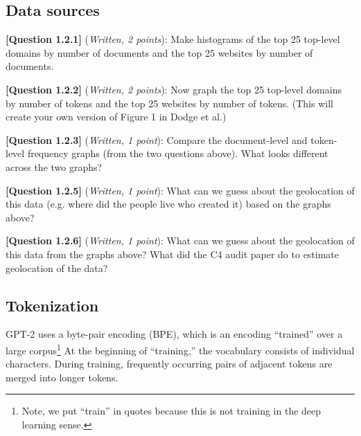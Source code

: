 \documentclass[leqno,12pt]{article}
\begin{document}
\subsection{Data sources}
\noindent \textbf{[Question 1.2.1]} (\emph{Written, 2 points}): Make histograms of the top 25 top-level domains by number of documents and the top 25 websites by number of documents. 
\begin{tcolorbox}[fit,height=10cm, width=\linewidth, blank, borderline={1pt}{-2pt}]
\end{tcolorbox}
\noindent \textbf{[Question 1.2.2]} (\emph{Written, 2 points}): Now graph the top 25 top-level domains by number of tokens and the top 25 websites by number of tokens. (This will create your own version of Figure 1 in Dodge et al.) 

\begin{tcolorbox}[fit,height=10cm, width=\linewidth, blank, borderline={1pt}{-2pt}]
\end{tcolorbox}

\noindent \textbf{[Question 1.2.3]} (\emph{Written, 1 point}): Compare the document-level and token-level frequency graphs (from the two questions above).  What looks different across the two graphs? 
\begin{tcolorbox}[fit,height=5cm, width=\linewidth, blank, borderline={1pt}{-2pt}]
\end{tcolorbox}

\noindent \textbf{[Question 1.2.5]} (\emph{Written, 1 point}): What can we guess about the geolocation of this data (e.g. where did the people live who created it) based on the graphs above?
\begin{tcolorbox}[fit,height=3cm, width=\linewidth, blank, borderline={1pt}{-2pt}]
\end{tcolorbox}

\noindent \textbf{[Question 1.2.6]} (\emph{Written, 1 point}): What can we guess about the geolocation of this data from the graphs above? What did the C4 audit paper do to estimate geolocation of the data? 
\begin{tcolorbox}[fit,height=3cm, width=\linewidth, blank, borderline={1pt}{-2pt}]
\end{tcolorbox}

\subsection{Tokenization}
\noindent GPT-2 uses a byte-pair encoding (BPE), which is an encoding ``trained'' over a large corpus\footnote{Note, we put ``train'' in quotes because this is not training in the deep learning sense.}
At the beginning of ``training,'' the vocabulary consists of individual characters.
During training, frequently occurring pairs of adjacent tokens are merged into longer tokens.
\end{document}

